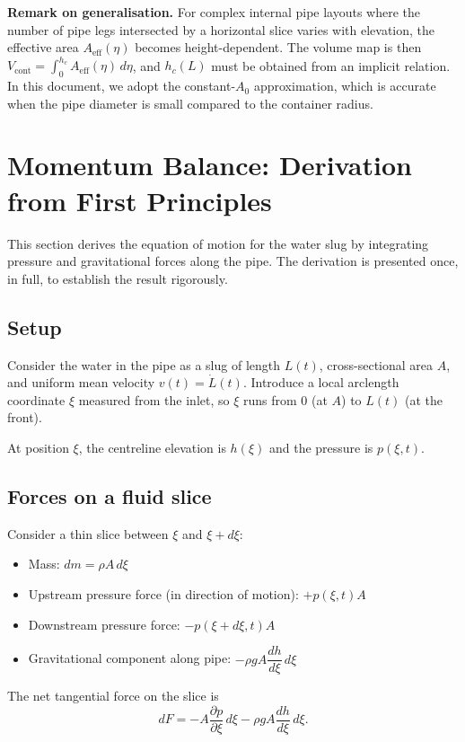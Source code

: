 \documentclass[11pt]{article}
\theoremstyle{definition}
\begin{document}
\textbf{Remark on generalisation.} For complex internal pipe layouts where the number of 
pipe legs intersected by a horizontal slice varies with elevation, the effective area 
$A_{\text{eff}}(\eta)$ becomes height-dependent. The volume map is then 
$V_{\text{cont}} = \int_0^{h_c} A_{\text{eff}}(\eta)\,d\eta$, and $h_c(L)$ must be obtained 
from an implicit relation. In this document, we adopt the constant-$A_0$ approximation, 
which is accurate when the pipe diameter is small compared to the container radius.

\section{Momentum Balance: Derivation from First Principles}
\label{sec:momentum}

This section derives the equation of motion for the water slug by integrating pressure and 
gravitational forces along the pipe. The derivation is presented once, in full, to establish 
the result rigorously.

\subsection{Setup}

Consider the water in the pipe as a slug of length $L(t)$, cross-sectional area $A$, and 
uniform mean velocity $v(t) = \dot{L}(t)$. Introduce a local arclength coordinate $\xi$ 
measured from the inlet, so $\xi$ runs from $0$ (at $A$) to $L(t)$ (at the front).

At position $\xi$, the centreline elevation is $h(\xi)$ and the pressure is $p(\xi, t)$.

\subsection{Forces on a fluid slice}

Consider a thin slice between $\xi$ and $\xi + d\xi$:
\begin{itemize}[nosep]
  \item Mass: $dm = \rho A\,d\xi$
  \item Upstream pressure force (in direction of motion): $+p(\xi, t) A$
  \item Downstream pressure force: $-p(\xi + d\xi, t) A$
  \item Gravitational component along pipe: $-\rho g A \dfrac{dh}{d\xi}\,d\xi$
\end{itemize}
The net tangential force on the slice is
\[
  dF = -A \frac{\partial p}{\partial \xi}\,d\xi - \rho g A \frac{dh}{d\xi}\,d\xi.
\]
\end{document}
